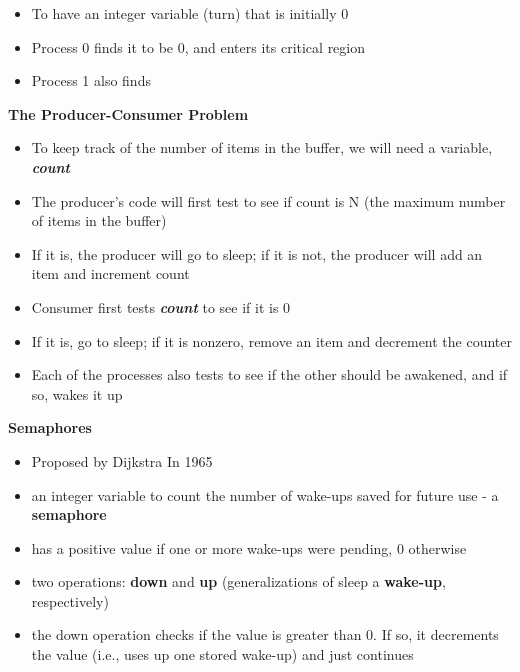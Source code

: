 \documentclass{article}
\begin{document}
\begin{itemize}
  \item To have an integer variable (turn) that is initially 0
  \item Process 0 finds it to be 0, and enters its critical region
  \item Process 1 also finds 
\end{itemize}

\textbf{The Producer-Consumer Problem}

\begin{itemize}
  \item To keep track of the number of items in the buffer, we will need a variable, \textbf{\textit{count}}
  \item The producer's code will first test to see if count is N (the maximum number of items in the buffer) 
  \item If it is, the producer will go to sleep; if it is not, the producer will add an item and increment count 
  \item Consumer first tests \textbf{\textit{count}} to see if it is 0
  \item If it is, go to sleep; if it is nonzero, remove an item and decrement the counter 
  \item Each of the processes also tests to see if the other should be awakened, and if so, wakes it up
\end{itemize}

\textbf{Semaphores}

\begin{itemize}
  \item Proposed by Dijkstra In 1965 
  \item an integer variable to count the number of wake-ups saved for future use - a \textbf{semaphore}
  \item has a positive value if one or more wake-ups were pending, 0 otherwise
  \item two operations: \textbf{down} and \textbf{up} (generalizations of sleep a \textbf{wake-up}, respectively)
  \item the down operation checks if the value is greater than 0. If so, it decrements the value (i.e., uses up one
    stored wake-up) and just continues
\end{itemize}
\end{document}
